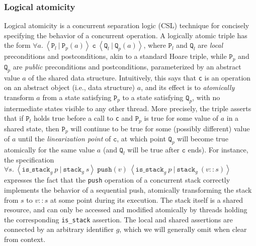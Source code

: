 \documentclass[a4paper,UKenglish,cleveref, autoref, thm-restate]{lipics-v2021}
\newcommand{\wm}[1]{\textbf{\textcolor{violet}{[William: #1]}}}
\begin{document}
\subsubsection{Logical atomicity} 


Logical atomicity is a concurrent separation logic (CSL) technique for concisely specifying the behavior of a concurrent operation. A logically atomic triple has the form $\forall a.\ \left\langle \texttt{P}_l\ |\ \texttt{P}_p(a) \right\rangle\ \texttt{c}\ \left\langle \texttt{Q}_l\ |\ \texttt{Q}_p(a)\right\rangle$, where $\texttt{P}_l$ and $\texttt{Q}_l$ are \emph{local} preconditions and postconditions, akin to a standard Hoare triple, while $\texttt{P}_p$ and $\texttt{Q}_p$ are \emph{public} preconditions and postconditions, parameterized by an abstract value $a$ of the shared data structure. Intuitively, this says that \lstinline{c} is an operation on an abstract object (i.e., data structure) $a$, and its effect is to \emph{atomically} transform $a$ from a state satisfying $\texttt{P}_p$ to a state satisfying $\texttt{Q}_p$, with no intermediate states visible to any other thread. More precisely, the triple asserts that if $\texttt{P}_l$ holds true before a call to \lstinline{c} and $\texttt{P}_p$ is true for some value of $a$ in a shared state, then $\texttt{P}_p$ will continue to be true for some (possibly different) value of $a$ until the \emph{linearization point} of $\texttt{c}$, at which point $\texttt{Q}_p$ will become true atomically for the same value $a$ (and $\texttt{Q}_l$ will be true after $\texttt{c}$ ends). For instance, the specification
$\forall s.\ \left\langle \texttt{is\_stack}_g\ p\ |\ \texttt{stack}_g\ s\right\rangle\ \texttt{push}(v)\ \left\langle \texttt{is\_stack}_g\ p\ |\ \texttt{stack}_g\ (v::s)\right\rangle$
expresses the fact that the \lstinline{push} operation of a concurrent stack correctly implements the behavior of a sequential push, atomically transforming the stack from $s$ to $v::s$ at some point during its execution. The stack itself is a shared resource, and can only be accessed and modified atomically by threads holding the corresponding \texttt{is\_stack} assertion. The local and shared assertions are connected by an arbitrary identifier $g$, which we will generally omit when clear from context.
\end{document}
